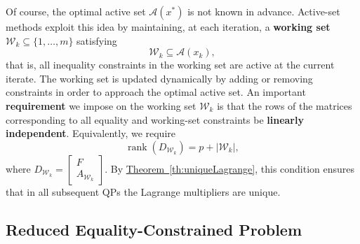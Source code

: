 \documentclass{book}
\theoremstyle{definition}
\newcommand{\thref}[1]{\hyperref[#1]{Theorem~\ref*{#1}}}
\numberwithin{algorithm_}{chapter}
\begin{document}
Of course, the optimal active set $\mathcal{A}(x^*)$ is not known in advance.  
Active-set methods exploit this idea by maintaining, at each iteration, a 
\textbf{working set} $\mathcal{W}_k \subseteq \{1,\dots,m\}$ satisfying
\[
\mathcal{W}_k \subseteq \mathcal{A}(x_k),
\]
that is, all inequality constraints in the working set are active at the current iterate.  
The working set is updated dynamically by adding or removing constraints in order to 
approach the optimal active set. An important \textbf{requirement} we impose on the working set $\mathcal{W}_k$ is that the rows of the matrices corresponding to all equality and working-set constraints be \textbf{linearly independent}.  
Equivalently, we require
\begin{equation} \label{eq:LICQ-assumption}
\operatorname{rank}(D_{\mathcal{W}_k}) = p + |\mathcal{W}_k|,
\end{equation}
where $D_{\mathcal{W}_k} = \begin{bmatrix} F \\ A_{\mathcal{W}_k} \end{bmatrix}$. 
By \thref{th:uniqueLagrange}, this condition ensures that in all subsequent QPs the Lagrange multipliers are unique.
  

\subsection{Reduced Equality-Constrained Problem}
\end{document}
